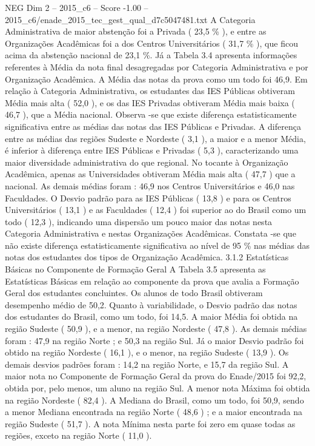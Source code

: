 \begin{textsample}{NEG Dim 2 – 2015\_c6 – Score -1.00 – 2015\_c6/enade\_2015\_tec\_gest\_qual\_d7c5047481.txt}
A Categoria Administrativa de maior abstenção foi a Privada ( 23,5 \% ), e entre as Organizações Acadêmicas foi a dos Centros Universitários ( 31,7 \% ), que ficou acima da abstenção nacional de 23,1 \%.
Já a Tabela 3.4 apresenta informações referentes à Média da nota final desagregadas por Categoria Administrativa e por Organização Acadêmica.
A Média das notas da prova como um todo foi 46,9.
Em relação à Categoria Administrativa, os estudantes das IES Públicas obtiveram Média mais alta ( 52,0 ), e os das IES Privadas obtiveram Média mais baixa ( 46,7 ), que a Média nacional.
Observa -se que existe diferença estatisticamente significativa entre as médias das notas das IES Públicas e Privadas.
A diferença entre as médias das regiões Sudeste e Nordeste ( 3,1 ), a maior e a menor Média, é inferior à diferença entre IES Públicas e Privadas ( 5,3 ), caracterizando uma maior diversidade administrativa do que regional.
No tocante à Organização Acadêmica, apenas as Universidades obtiveram Média mais alta ( 47,7 ) que a nacional.
As demais médias foram : 46,9 nos Centros Universitários e 46,0 nas Faculdades.
O Desvio padrão para as IES Públicas ( 13,8 ) e para os Centros Universitários ( 13,1 ) e as Faculdades ( 12,4 ) foi superior ao do Brasil como um todo ( 12,3 ), indicando uma dispersão um pouco maior das notas nesta Categoria Administrativa e nestas Organizações Acadêmicas.
Constata -se que não existe diferença estatisticamente significativa ao nível de 95 \% nas médias das notas dos estudantes dos tipos de Organização Acadêmica. 3.1.2 Estatísticas Básicas no Componente de Formação Geral A Tabela 3.5 apresenta as Estatísticas Básicas em relação ao componente da prova que avalia a Formação Geral dos estudantes concluintes.
Os alunos de todo Brasil obtiveram desempenho médio de 50,2.
Quanto à variabilidade, o Desvio padrão das notas dos estudantes do Brasil, como um todo, foi 14,5.
A maior Média foi obtida na região Sudeste ( 50,9 ), e a menor, na região Nordeste ( 47,8 ).
As demais médias foram : 47,9 na região Norte ; e 50,3 na região Sul.
Já o maior Desvio padrão foi obtido na região Nordeste ( 16,1 ), e o menor, na região Sudeste ( 13,9 ).
Os demais desvios padrões foram : 14,2 na região Norte, e 15,7 da região Sul.
A maior nota no Componente de Formação Geral da prova do Enade/2015 foi 92,2, obtida por, pelo menos, um aluno na região Sul.
A menor nota Máxima foi obtida na região Nordeste ( 82,4 ).
A Mediana do Brasil, como um todo, foi 50,9, sendo a menor Mediana encontrada na região Norte ( 48,6 ) ; e a maior encontrada na região Sudeste ( 51,7 ).
A nota Mínima nesta parte foi zero em quase todas as regiões, exceto na região Norte ( 11,0 ).

\end{textsample}
